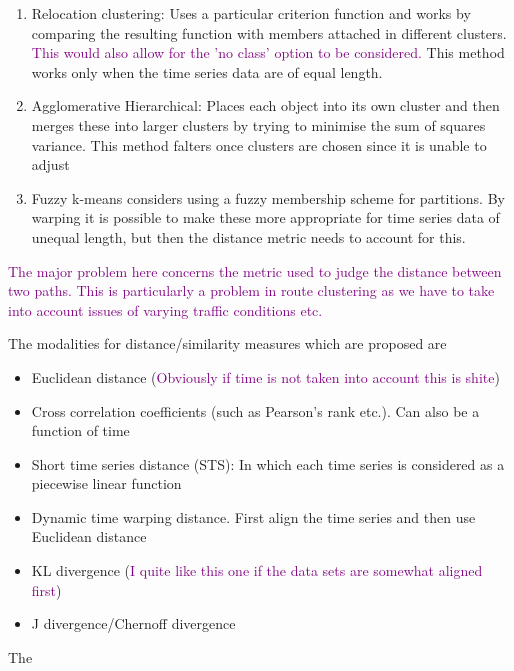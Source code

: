 \documentclass{article}
\newcommand\NOTE[1]{\textcolor{purple}{#1}}
\begin{document}
    \begin{enumerate}
        \item Relocation clustering: Uses a particular criterion function and works by comparing the resulting function with members attached in different clusters. \NOTE{This would also allow for the 'no class' option to be considered.} This method works only when the time series data are of equal length.
        \item Agglomerative Hierarchical: Places each object into its own cluster and then merges these into larger clusters by trying to minimise the sum of squares variance. This method falters once clusters are chosen since it is unable to adjust
        \item Fuzzy k-means considers using a fuzzy membership scheme for partitions. By warping it is possible to make these more appropriate for time series data of unequal length, but then the distance metric needs to account for this.
    \end{enumerate}

    \NOTE{The major problem here concerns the metric used to judge the distance between two paths. This is particularly a problem in route clustering as we have to take into account issues of varying traffic conditions etc.}

    The modalities for distance/similarity measures which are proposed are

    \begin{itemize}
        \item Euclidean distance (\NOTE{Obviously if time is not taken into account this is shite})
        \item Cross correlation coefficients (such as Pearson's rank etc.). Can also be a function of time
        \item Short time series distance (STS): In which each time series is considered as a piecewise linear function
        \item Dynamic time warping distance. First align the time series and then use Euclidean distance
        \item KL divergence (\NOTE{I quite like this one if the data sets are somewhat aligned first})
        \item J divergence/Chernoff divergence
    \end{itemize}

    The 
\end{document}
